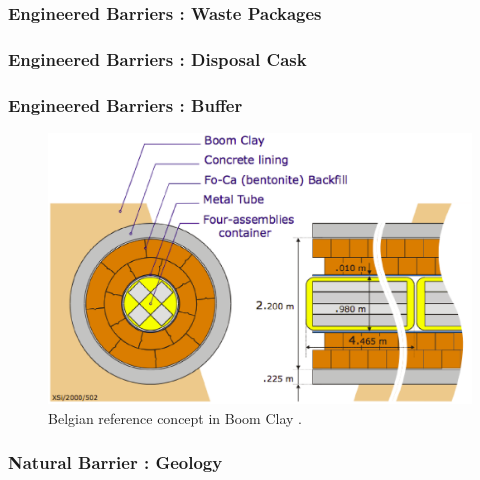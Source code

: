 \begin{frame}[ctb!]
  \frametitle{Engineered Barriers : Waste Packages}
\footnotesize{
  
}
\end{frame}

\begin{frame}[ctb!]
  \frametitle{Engineered Barriers : Disposal Cask}
\footnotesize{
  
}
\end{frame}

\begin{frame}[ctb!]
  \frametitle{Engineered Barriers : Buffer}
\footnotesize{
  \begin{figure}[h!]
    \begin{center}
      \includegraphics[height=.7\textheight]{./images/belgianClayRedImp.eps}
    \end{center}
    \caption{Belgian reference concept in Boom Clay 
    \cite{von_lensa_red-impact_2008}.}
    \label{fig:belgianClayRedImp}
  \end{figure}
}
\end{frame}

\begin{frame}[ctb!]
  \frametitle{Natural Barrier : Geology}
\footnotesize{
  
}
\end{frame}
\setcounter{framenumber}{\value{finalframe}}
